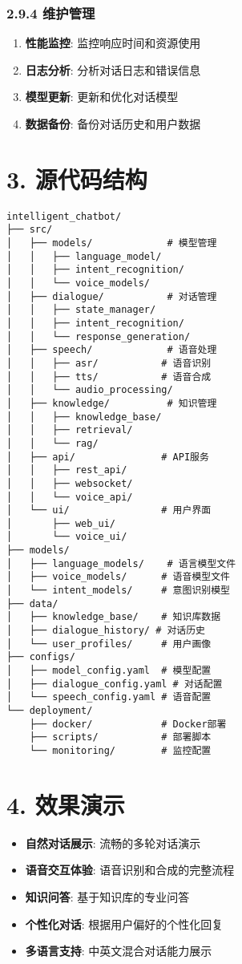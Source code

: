 \subsubsection{2.9.4 维护管理}\label{ux7ef4ux62a4ux7ba1ux7406}

\begin{enumerate}
\def\labelenumi{\arabic{enumi}.}
\tightlist
\item
  \textbf{性能监控}: 监控响应时间和资源使用
\item
  \textbf{日志分析}: 分析对话日志和错误信息
\item
  \textbf{模型更新}: 更新和优化对话模型
\item
  \textbf{数据备份}: 备份对话历史和用户数据
\end{enumerate}

\section{3. 源代码结构}\label{ux6e90ux4ee3ux7801ux7ed3ux6784}

\begin{lstlisting}
intelligent_chatbot/
├── src/
│   ├── models/             # 模型管理
│   │   ├── language_model/
│   │   ├── intent_recognition/
│   │   └── voice_models/
│   ├── dialogue/           # 对话管理
│   │   ├── state_manager/
│   │   ├── intent_recognition/
│   │   └── response_generation/
│   ├── speech/             # 语音处理
│   │   ├── asr/           # 语音识别
│   │   ├── tts/           # 语音合成
│   │   └── audio_processing/
│   ├── knowledge/          # 知识管理
│   │   ├── knowledge_base/
│   │   ├── retrieval/
│   │   └── rag/
│   ├── api/               # API服务
│   │   ├── rest_api/
│   │   ├── websocket/
│   │   └── voice_api/
│   └── ui/                # 用户界面
│       ├── web_ui/
│       └── voice_ui/
├── models/
│   ├── language_models/    # 语言模型文件
│   ├── voice_models/      # 语音模型文件
│   └── intent_models/     # 意图识别模型
├── data/
│   ├── knowledge_base/    # 知识库数据
│   ├── dialogue_history/ # 对话历史
│   └── user_profiles/     # 用户画像
├── configs/
│   ├── model_config.yaml  # 模型配置
│   ├── dialogue_config.yaml # 对话配置
│   └── speech_config.yaml # 语音配置
└── deployment/
    ├── docker/            # Docker部署
    ├── scripts/           # 部署脚本
    └── monitoring/        # 监控配置
\end{lstlisting}

\section{4. 效果演示}\label{ux6548ux679cux6f14ux793a}

\begin{itemize}
\tightlist
\item
  \textbf{自然对话展示}: 流畅的多轮对话演示
\item
  \textbf{语音交互体验}: 语音识别和合成的完整流程
\item
  \textbf{知识问答}: 基于知识库的专业问答
\item
  \textbf{个性化对话}: 根据用户偏好的个性化回复
\item
  \textbf{多语言支持}: 中英文混合对话能力展示
\end{itemize}
